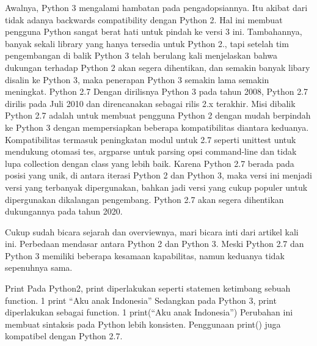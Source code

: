 Awalnya, Python 3 mengalami hambatan pada pengadopsiannya. Itu akibat dari tidak adanya backwards compatibility dengan Python 2. Hal ini membuat pengguna Python sangat berat hati untuk pindah ke versi 3 ini. Tambahannya, banyak sekali library yang hanya tersedia untuk Python 2., tapi setelah tim pengembangan di balik Python 3 telah berulang kali menjelaskan bahwa dukungan terhadap Python 2 akan segera dihentikan, dan semakin banyak libary disalin ke Python 3, maka penerapan Python 3 semakin lama semakin meningkat.
Python 2.7
Dengan dirilisnya Python 3 pada tahun 2008, Python 2.7 dirilis pada Juli 2010 dan direncanakan sebagai rilis 2.x terakhir. Misi dibalik Python 2.7 adalah untuk membuat pengguna Python 2 dengan mudah berpindah ke Python 3 dengan mempersiapkan beberapa kompatibilitas diantara keduanya. Kompatibilitas termasuk peningkatan modul untuk 2.7 seperti unittest untuk mendukung otomasi tes, argparse untuk parsing opsi command-line dan tidak lupa collection dengan class yang lebih baik.
Karena Python 2.7 berada pada posisi yang unik, di antara iterasi Python 2 dan Python 3, maka versi ini menjadi versi yang terbanyak dipergunakan, bahkan jadi versi yang cukup populer untuk dipergunakan dikalangan pengembang. Python 2.7 akan segera dihentikan dukungannya pada tahun 2020.

Cukup sudah bicara sejarah dan overviewnya, mari bicara inti dari artikel kali ini. Perbedaan mendasar antara Python 2 dan Python 3. Meski Python 2.7 dan Python 3 memiliki beberapa kesamaan kapabilitas, namun keduanya tidak sepenuhnya sama.
 
Print
Pada Python2, print diperlakukan seperti statemen ketimbang sebuah function.
1	print “Aku anak Indonesia”
Sedangkan pada Python 3, print diperlakukan sebagai function.
1	print(“Aku anak Indonesia”)
Perubahan ini membuat sintaksis pada Python lebih konsisten. Penggunaan print()  juga kompatibel dengan Python 2.7.
 
